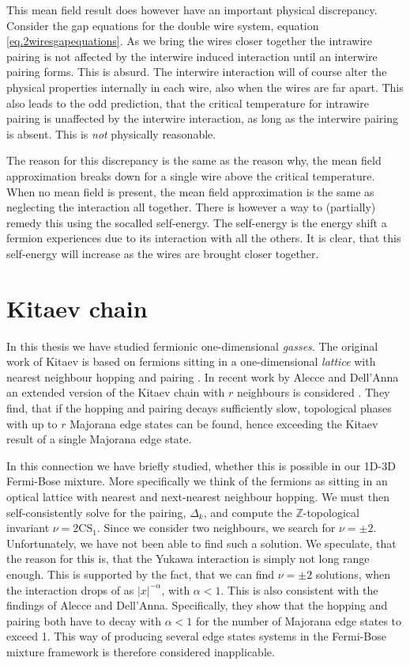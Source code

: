 This mean field result does however have an important physical discrepancy. Consider the gap equations for the double wire system, equation \eqref{eq.2wiresgapequations}. As we bring the wires closer together the intrawire pairing is not affected by the interwire induced interaction until an interwire pairing forms. This is absurd. The interwire interaction will of course alter the physical properties internally in each wire, also when the wires are far apart. This also leads to the odd prediction, that the critical temperature for intrawire pairing is unaffected by the interwire interaction, as long as the interwire pairing is absent. This is \textit{not} physically reasonable. 

The reason for this discrepancy is the same as the reason why, the mean field approximation breaks down for a single wire above the critical temperature. When no mean field is present, the mean field approximation is the same as neglecting the interaction all together. There is however a way to (partially) remedy this using the socalled self-energy. The self-energy is the energy shift a fermion experiences due to its interaction with all the others. It is clear, that this self-energy will increase as the wires are brought closer together. 

\section{Kitaev chain} \label{sec.Discussion.KitaevChain}
In this thesis we have studied fermionic one-dimensional \textit{gasses}. The original work of Kitaev is based on fermions sitting in a one-dimensional \textit{lattice} with nearest neighbour hopping and pairing \cite{KitaevQuantumWires}. In recent work by Alecce and Dell'Anna an extended version of the Kitaev chain with $r$ neighbours is considered \cite{Alecce.extendKitaev}. They find, that if the hopping and pairing decays sufficiently slow, topological phases with up to $r$ Majorana edge states can be found, hence exceeding the Kitaev result of a single Majorana edge state. 

In this connection we have briefly studied, whether this is possible in our 1D-3D Fermi-Bose mixture. More specifically we think of the fermions as sitting in an optical lattice with nearest and next-nearest neighbour hopping. We must then self-consistently solve for the pairing, $\Delta_k$, and compute the $\mathbb{Z}$-topological invariant $\nu = 2\text{CS}_1$. Since we consider two neighbours, we search for $\nu = \pm 2$. Unfortunately, we have not been able to find such a solution. We speculate, that the reason for this is, that the Yukawa interaction is simply not long range enough. This is supported by the fact, that we can find $\nu = \pm 2$ solutions, when the interaction drops of as $|x|^{-\alpha}$, with $\alpha < 1$. This is also consistent with the findings of Alecce and Dell'Anna. Specifically, they show that the hopping and pairing both have to decay with $\alpha < 1$ for the number of Majorana edge states to exceed 1. This way of producing several edge states systems in the Fermi-Bose mixture framework is therefore considered inapplicable. 


